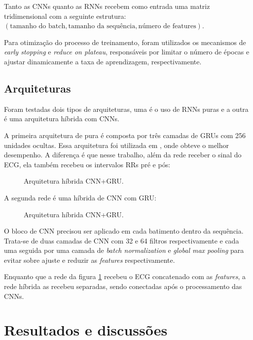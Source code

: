 \documentclass[
    12pt,                %
    openright,           %
    oneside,             %
    a4paper,             %
    brazil               %
]{abntex2}
\begin{document}
Tanto as CNNs quanto as RNNs recebem como entrada uma matriz tridimensional com a seguinte estrutura: $(\text{tamanho do batch}, \text{tamanho da sequência}, \text{número de features})$.

Para otimização do processo de treinamento, foram utilizados os mecanismos de \textit{early stopping} e \textit{reduce on plateau}, responsáveis por limitar o número de épocas e ajustar dinamicamente a taxa de aprendizagem, respectivamente.

\section{Arquiteturas}
\label{sec:modelos}

Foram testadas dois tipos de arquiteturas, uma é o uso de RNNs puras e a outra é uma arquitetura híbrida com CNNs. 

A primeira arquitetura de pura é composta por três camadas de GRUs com 256 unidades ocultas. Essa arquitetura foi utilizada em , onde obteve o melhor desempenho. 
A diferença é que nesse trabalho, além da rede receber o sinal do ECG, ela também recebeu os intervalos RRs pré e pós:


\begin{figure}[H]
  \centering
  \caption{Arquitetura híbrida CNN+GRU.}
  \label{fig:gru_pura}
\end{figure}

A segunda rede é uma híbrida de CNN com GRU:

\begin{figure}[H]
  \centering
  \caption{Arquitetura híbrida CNN+GRU.}
  \label{fig:cnn_gru}
\end{figure}

O bloco de CNN precisou ser aplicado em cada batimento dentro da sequência. Trata-se de duas camadas de CNN com 32 e 64 filtros respectivamente e cada 
uma seguida por uma camada de \textit{batch normalization} e \textit{global max pooling} para evitar sobre ajuste e reduzir as \textit{features} respectivamente.

Enquanto que a rede da figura \ref{fig:gru_pura} recebeu o ECG concatenado com as \textit{features}, a rede híbrida as recebeu separadas, sendo conectadas após o processamento
das CNNs.

\chapter{Resultados e discussões}
\end{document}
